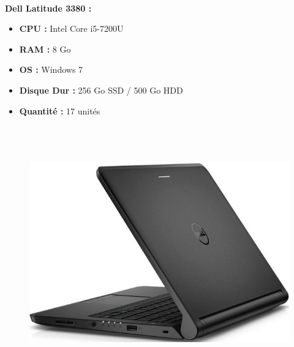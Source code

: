 \documentclass[11pt,a4paper,oneside]{article}
\begin{document}
\paragraph{}\textbf{Dell Latitude 3380 :} \\
\begin{itemize}
\item \textbf{CPU :} Intel Core i5-7200U
\item \textbf{RAM :} 8 Go
\item \textbf{OS :} Windows 7
\item \textbf{Disque Dur :} 256 Go SSD / 500 Go HDD
\item \textbf{Quantité :} 17 unités
\\ \\ \\ \\
\end{itemize}
\begin{figure}
\includegraphics[scale=0.4]{Ressources/Materiel/L3350.jpg}\vspace{-2cm}
\end{figure}
\end{document}
